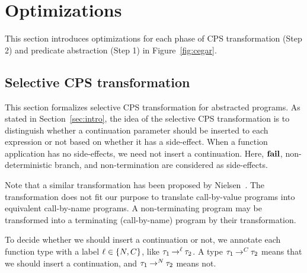 \section{Optimizations}
\label{sec:opt}

This section introduces optimizations for each phase of CPS
transformation (Step 2) and predicate abstraction (Step 1) in
Figure~\ref{fig:cegar}.


\subsection{Selective CPS transformation}
\label{sec:CPS}

This section formalizes selective CPS transformation for abstracted
programs.  As stated in Section~\ref{sec:intro}, the idea of the selective
CPS transformation is to distinguish whether a continuation parameter
should be inserted to each expression or not based on whether it has a
side-effect.  When a function application has no side-effects, we need
not insert a continuation.  Here, $\mathbf{fail}$,
non-deterministic branch, and non-termination are considered as
side-effects.

Note that a similar transformation has been proposed by
Nielsen~\cite{Nielsen2001}.  The transformation does not fit our purpose
to translate call-by-value programs into equivalent call-by-name
programs.  A non-terminating program may be transformed into a
terminating (call-by-name) program by their transformation.

To decide whether we should insert a continuation or not, we
annotate each function type with a label $\ell \in \{N,C\}$, like
${\tau_1}\mathbin{\rightarrow^{\ell}}{\tau_2}$.  A type ${\tau_1}\mathbin{\rightarrow^{C}}{\tau_2}$ means
that we should insert a continuation, and ${\tau_1}\mathbin{\rightarrow^{N}}{\tau_2}$ means
not.


